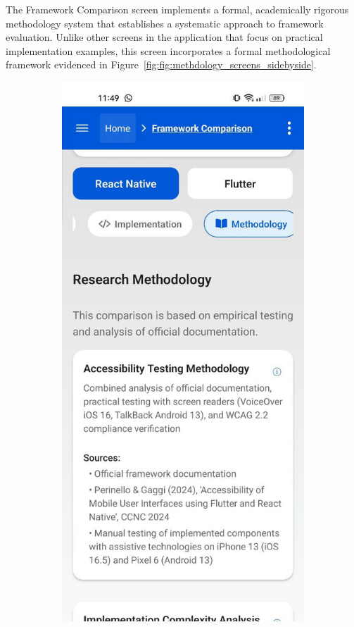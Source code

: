 The Framework Comparison screen implements a formal, academically rigorous methodology system that establishes a systematic approach to framework evaluation. Unlike other screens in the application that focus on practical implementation examples, this screen incorporates a formal methodological framework evidenced in Figure~\ref{fig:fig:methdology_screens_sidebyside}.

\begin{figure}[ht]
    \centering
    \begin{subfigure}[b]{0.48\textwidth}
        \centering
        \includegraphics[width=\linewidth, alt={Methodology tab of the Frameworks Comparison screen}]{img/methodology1.jpg}

\end{subfigure}
\end{figure}
